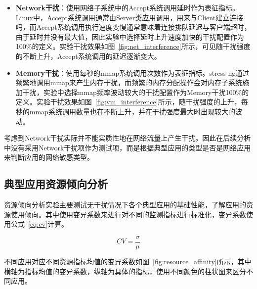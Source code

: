 \begin{itemize}
    \item \textbf{Network干扰}：使用网络子系统中的Accept系统调用延时作为表征指标。Linux中，Accept系统调用通常由Server类应用调用，用来与Client建立连接吗，而Accept系统调用执行速度变慢通常意味着连接排队延迟与客户端超时，由于延时并没有最大值，因此实验中选择延时上升速度加快的干扰配置作为100\%的定义。实验干扰效果如图~\ref{fig:net_interference}所示，可见随干扰强度的不断上升，Accept系统调用的延迟逐渐变大。
    
    \item \textbf{Memory干扰}：使用每秒的mmap系统调用次数作为表征指标。stress-ng通过频繁地调用mmap来产生内存干扰，而频繁的内存分配操作会对内存子系统施加干扰，实验中选择mmap频率波动较大的干扰配置作为Memory干扰100\%的定义。实验干扰效果如图~\ref{fig:vm_interference}所示，随干扰强度的上升，每秒的mmap系统调用数量也在不断上升，并在干扰强度最大时出现较大的波动。
\end{itemize}

考虑到Network干扰实际并不能实质性地在网络流量上产生干扰。因此在后续分析中没有采用Network干扰项作为测试项，而是根据典型应用的类型是否是网络应用来判断应用的网络敏感类型。

\subsection{典型应用资源倾向分析}

资源倾向分析实验主要测试无干扰情况下各个典型应用的基础性能，了解应用的资源使用倾向。其中使用变异系数来进行对不同的监测指标进行标准化，变异系数使用公式~\eqref{eq:cv}计算。

\begin{equation}\label{eq:cv}
    CV = \frac{\sigma}{\mu}
\end{equation}

不同应用对应不同资源指标均值的变异系数如图~\ref{fig:resource_affinity}所示，其中横轴为指标均值的变异系数，纵轴为具体的指标，使用不同颜色的柱状图来区分不同应用。

